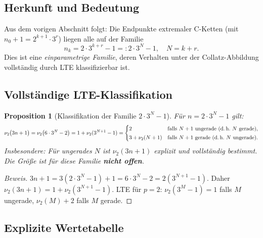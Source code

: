 \documentclass[12pt,a4paper]{article}
\newtheorem{proposition}[definition]{Proposition}
\newenvironment{beweis}{\begin{proof}[Beweis]}{\end{proof}}
\newcommand{\vii}{\nu_2}
\begin{document}
\subsection{Herkunft und Bedeutung}

Aus dem vorigen Abschnitt folgt: Die Endpunkte extremaler C-Ketten
(mit $n_0+1 = 2^{k+1}\cdot 3^r$) liegen alle auf der Familie
\[
  n_k = 2\cdot 3^{k+r} - 1 =: 2\cdot 3^N - 1, \quad N = k+r.
\]
Dies ist eine \emph{einparametrige Familie}, deren Verhalten unter der
Collatz-Abbildung vollständig durch LTE klassifizierbar ist.

\subsection{Vollständige LTE-Klassifikation}

\begin{proposition}[Klassifikation der Familie $2\cdot 3^N - 1$]
\label{prop:endpunktfamilie}
Für $n = 2\cdot 3^N - 1$ gilt:
\[
  \vii\bigl(3n + 1\bigr)
  = \vii\bigl(6\cdot 3^N - 2\bigr)
  = 1 + \vii(3^{N+1} - 1)
  =
  \begin{cases}
    2 & \text{falls $N+1$ ungerade (d.\,h.\ $N$ gerade),}\\[2pt]
    3 + \vii(N+1) & \text{falls $N+1$ gerade (d.\,h.\ $N$ ungerade).}
  \end{cases}
\]
Insbesondere: Für ungerades $N$ ist $\vii(3n+1)$ explizit und vollständig
bestimmt. Die Größe ist für diese Familie \textbf{nicht offen}.
\end{proposition}

\begin{beweis}
$3n + 1 = 3(2\cdot 3^N - 1) + 1 = 6\cdot 3^N - 2 = 2(3^{N+1} - 1)$.
Daher $\vii(3n+1) = 1 + \vii(3^{N+1}-1)$.
LTE für $p=2$: $\vii(3^M - 1) = 1$ falls $M$ ungerade, $\vii(M)+2$ falls
$M$ gerade.
\end{beweis}

\subsection{Explizite Wertetabelle}
\end{document}
